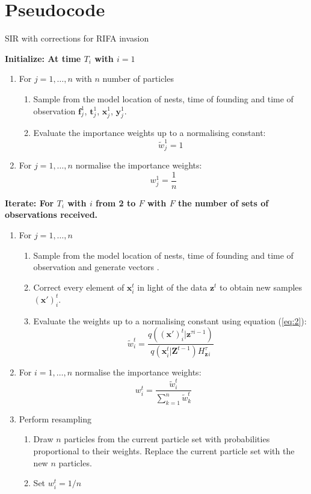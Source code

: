 \documentclass[11pt,a4paper]{article}
\renewcommand{\vec}[1]{\mathbf{#1}}
\begin{document}
{\color{red}
\section{Pseudocode}

\begin{algorithm}[H]
\caption{SIR with corrections for RIFA invasion}
 \begin{algorithmic}

 \State  \bf{Initialize:} \normalfont At time $T_i$ with $i = 1$
            
\begin{enumerate}
	\item For $j = 1, \dots , n$ with $n$ number of particles
	\begin{enumerate}
		\item Sample from the model location of nests, time of founding and time of observation $\vec{f}^1_j$, $\vec{t}^1_j$, $\vec{x}^1_j$, $\vec{y}^1_j$.
		\item Evaluate the importance weights up to a normalising constant:
		\[
		\tilde{w}^{1}_{j} = 1
		\]
	\end{enumerate}
	\item For $j = 1, \dots , n$ normalise the importance weights: 
	\[
	w^{1}_{j} = \frac{1}{n}
	\]
\end{enumerate}

 \State  \bf{Iterate:} \normalfont For $T_i$ with $i$ from 2 to $F$ with $F$ the number of sets of observations received.

\begin{enumerate}
	\item For $j = 1, \dots , n$
	\begin{enumerate}
  		\item Sample from the model location of nests, time of founding and time of observation and generate vectors .
		\item Correct every element of $\vec{x}^t_i$ in light of the data $\vec{z}^t$ to obtain new samples $(\vec{x'})^t_i$.
		\item Evaluate the weights up to a normalising constant using equation (\ref{eq:2}):
		\[
		\tilde{w}^{t}_{i} = \frac{q(\vec{(x')}^{t}_i| \vec{z}^{\tau{i-1}})}{q(\vec{x}^{t}_i | \vec{Z}^{t-1}) H_\vec{z}^{\tau}_i}
		\]
	\end{enumerate}
	\item For $i = 1, \dots , n$ normalise the importance weights:
	\[
	w^{t}_{i} = \frac{\tilde{w}^t_i}{\sum_{k=1}^{n}\tilde{w}^{t}_k}
	\]
	\item Perform resampling
	\begin{enumerate}
	    \item Draw $n$ particles from the current particle set with probabilities proportional to their weights. Replace the current particle set with the new $n$ particles.
	    \item Set $w^t_i=1/n$
	\end{enumerate}
\end{enumerate}
  
 \end{algorithmic}
\end{algorithm}

}
\end{document}
